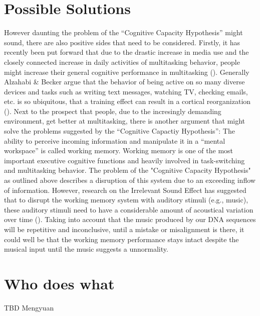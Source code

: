 \documentclass[10pt]{article}
\begin{document}
\section{Possible Solutions}
However daunting the problem of the “Cognitive Capacity Hypothesis” might sound, there are also positive sides that need to be considered. Firstly, it has recently been put forward that due to the drastic increase in media use and the closely connected increase in daily activities of multitasking behavior, people might increase their general cognitive performance in multitasking (\cite{Alzahabi_Becker_2013}). Generally Alzahabi \& Becker argue that the behavior of being active on so many diverse devices and tasks such as writing text messages, watching TV, checking emails, etc. is so ubiquitous, that a training effect can result in a cortical reorganization (\cite{Draganski_May_2008}). Next to the prospect that people, due to the incresingly demanding environment, get better at multitasking, there is another argument that might solve the problems suggested by the “Cognitive Capactiy Hypothesis”: The ability to perceive incoming information and manipulate it in a “mental workspace” is called working memory. Working memory is one of the most important executive cognitive functions and heavily involved in task-switching and multitasking behavior. The problem of the "Cognitive Capacity Hypothesis" as outlined above describes a disruption of this system due to an exceeding inflow of information. However, research on the Irrelevant Sound Effect has suggested that to disrupt the working memory system with auditory stimuli (e.g., music), these auditory stimuli need to have a considerable amount of acoustical variation over time (\cite{Vizard_Perham_2010}). Taking into account that the music produced by our DNA sequences will be repetitive and inconclusive, until a mistake or misalignment is there, it could well be that the working memory performance stays intact despite the musical input until the music suggests a unnormality.

\section{Who does what}

TBD Mengyuan


\newpage
\clearpage
\thispagestyle{empty}

\nocite{*}
\printbibliography
\end{document}

